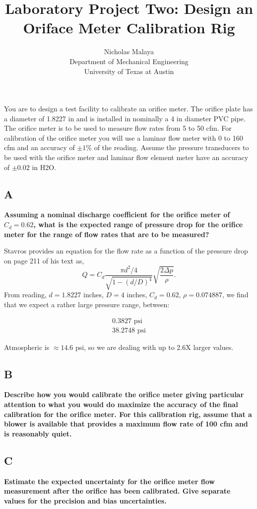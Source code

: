 \documentclass{article}
\title{\bf{Laboratory Project Two: Design an Oriface Meter Calibration Rig}}
\author{Nicholas Malaya \\ Department of Mechanical Engineering \\ University of Texas at Austin} \date{}
\begin{document}
\maketitle
\date{}

You are to design a test facility to calibrate an orifice meter. The orifice plate has a diameter of
1.8227 in and is installed in nominally a 4 in diameter PVC pipe. The orifice meter is to be used 
to measure flow rates from 5 to 50 cfm. For calibration of the orifice meter you will use a 
laminar flow meter with 0 to 160 cfm and an accuracy of $\pm 1\%$ of the reading. Assume the 
pressure transducers to be used with the orifice meter and laminar flow element meter have an 
accuracy of $\pm 0.02$ in H2O.

\subsection*{A}
\textbf{Assuming a nominal discharge coefficient for the orifice meter of $C_d = 0.62$, what is the
expected range of pressure drop for the orifice meter for the range of flow rates that are to be 
measured?}

Stavros provides an equation for the flow rate as a function of the
pressure drop on page 211 of his text as,  
\begin{equation*}
 Q = C_d \frac{\pi d^2 / 4}{\sqrt{1-(d/D)^4}}\sqrt{\frac{2 \Delta p}{\rho}}.
\end{equation*}
From reading, $d = 1.8227$ inches, $D = 4 $ inches, $C_d = 0.62$, $\rho
= 0.074887$, we find that we expect a rather large pressure range,
between:

\begin{eqnarray*}
  0.3827  \text{ psi} \\
 38.2748  \text{ psi}
\end{eqnarray*}

Atmospheric is $\approx 14.6$ psi, so we are dealing with up to 2.6X
larger values. 


\subsection*{B}
\textbf{Describe how you would calibrate the orifice meter giving particular attention to what you
would do maximize the accuracy of the final calibration for the orifice meter. For this 
calibration rig, assume that a blower is available that provides a maximum flow rate of 100 
cfm and is reasonably quiet.}

\subsection*{C}
\textbf{Estimate the expected uncertainty for the orifice meter flow measurement after the orifice has
been calibrated. Give separate values for the precision and bias uncertainties.}
\end{document}
